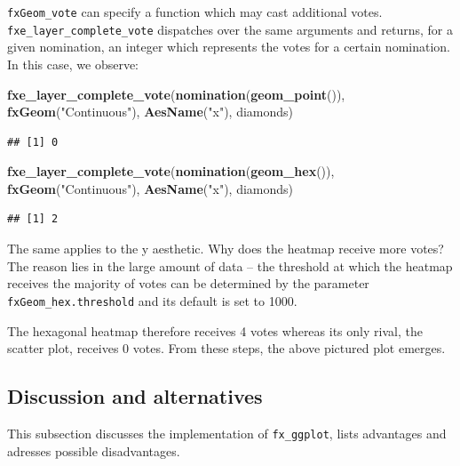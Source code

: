 \documentclass[]{report}
\newenvironment{Shaded}{\begin{snugshade}}{\end{snugshade}}
\newcommand{\KeywordTok}[1]{\textcolor[rgb]{0.13,0.29,0.53}{\textbf{#1}}}
\newcommand{\StringTok}[1]{\textcolor[rgb]{0.31,0.60,0.02}{#1}}
\newcommand{\NormalTok}[1]{#1}
\theoremstyle{definition}
\theoremstyle{definition}
\theoremstyle{definition}
\theoremstyle{remark}
\begin{document}
\texttt{fxGeom\_vote} can specify a function which may cast additional
votes. \texttt{fxe\_layer\_complete\_vote} dispatches over the same
arguments and returns, for a given nomination, an integer which
represents the votes for a certain nomination. In this case, we observe:

\begin{Shaded}
\begin{Highlighting}[]
\KeywordTok{fxe_layer_complete_vote}\NormalTok{(}\KeywordTok{nomination}\NormalTok{(}\KeywordTok{geom_point}\NormalTok{()), }\KeywordTok{fxGeom}\NormalTok{(}\StringTok{"Continuous"}\NormalTok{), }\KeywordTok{AesName}\NormalTok{(}\StringTok{"x"}\NormalTok{), diamonds)}
\end{Highlighting}
\end{Shaded}

\begin{verbatim}
## [1] 0
\end{verbatim}

\begin{Shaded}
\begin{Highlighting}[]
\KeywordTok{fxe_layer_complete_vote}\NormalTok{(}\KeywordTok{nomination}\NormalTok{(}\KeywordTok{geom_hex}\NormalTok{()), }\KeywordTok{fxGeom}\NormalTok{(}\StringTok{"Continuous"}\NormalTok{), }\KeywordTok{AesName}\NormalTok{(}\StringTok{"x"}\NormalTok{), diamonds)}
\end{Highlighting}
\end{Shaded}

\begin{verbatim}
## [1] 2
\end{verbatim}

The same applies to the y aesthetic. Why does the heatmap receive more
votes? The reason lies in the large amount of data -- the threshold at
which the heatmap receives the majority of votes can be determined by
the parameter \texttt{fxGeom\_hex.threshold} and its default is set to
1000.

The hexagonal heatmap therefore receives 4 votes whereas its only rival,
the scatter plot, receives 0 votes. From these steps, the above pictured
plot emerges.

\subsection{Discussion and
alternatives}\label{discussion-and-alternatives}

This subsection discusses the implementation of \texttt{fx\_ggplot},
lists advantages and adresses possible disadvantages.
\end{document}

